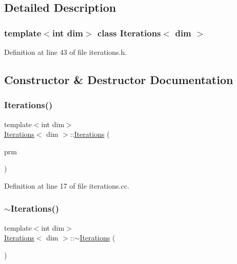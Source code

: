 \subsection{Detailed Description}
\subsubsection*{template$<$int dim$>$\newline
class Iterations$<$ dim $>$}



Definition at line 43 of file iterations.\+h.



\subsection{Constructor \& Destructor Documentation}
\mbox{\label{class_iterations_a0355678383cd174840beb772ce7e9e8d}} 
\subsubsection{\texorpdfstring{Iterations()}{Iterations()}}
{\footnotesize\ttfamily template$<$int dim$>$ \\
\hyperlink{class_iterations}{Iterations}$<$ dim $>$\+::\hyperlink{class_iterations}{Iterations} (\begin{DoxyParamCaption}\item[{const Parameter\+Handler \&}]{prm }\end{DoxyParamCaption})}



Definition at line 17 of file iterations.\+cc.

\mbox{\label{class_iterations_ae6ea082615afe8919000b4ea1465f9cf}} 
\subsubsection{\texorpdfstring{$\sim$\+Iterations()}{~Iterations()}}
{\footnotesize\ttfamily template$<$int dim$>$ \\
\hyperlink{class_iterations}{Iterations}$<$ dim $>$\+::$\sim$\hyperlink{class_iterations}{Iterations} (\begin{DoxyParamCaption}{ }\end{DoxyParamCaption})}



